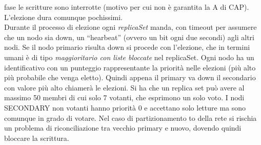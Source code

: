 \documentclass[a4paper,12pt, oneside]{book}
\begin{document}
fase le scritture sono interrotte (motivo per cui non è garantita la A di
CAP). L'elezione dura comunque pochissimi.\\
Durante il processo di elezione ogni \textit{replicaSet} manda, con timeout per
assumere che un nodo sia down, un
``hearbeat'' (ovvero un bit ogni due secondi) agli altri nodi. Se il nodo
primario risulta down si procede con l'elezione, che in termini umani è di tipo
\textit{maggioritario con liste bloccate} nel replicaSet. Ogni nodo ha un
identificativo con un punteggio rappresentante la priorità nelle elezioni
(più alto più probabile che venga eletto). Quindi appena il primary va down il
secondario con valore più alto chiamerà le elezioni. Si ha che un replica set
può avere al massimo 50 membri di cui solo 7 votanti, che esprimono un solo
voto. I nodi SECONDARY non votanti hanno priorità 0 e accettano solo letture ma
sono comunque in grado di votare. Nel caso di partizionamento
to della rete si rischia un problema di riconciliazione tra vecchio primary
e nuovo, dovendo quindi bloccare la scrittura.
\end{document}
